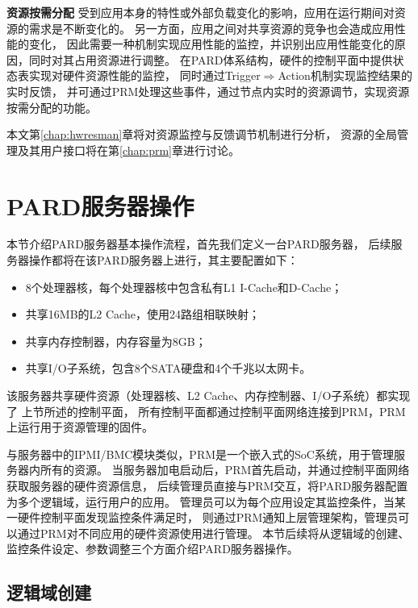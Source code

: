 \textbf{资源按需分配}\quad
受到应用本身的特性或外部负载变化的影响，应用在运行期间对资源的需求是不断变化的。
另一方面，应用之间对共享资源的竞争也会造成应用性能的变化，
因此需要一种机制实现应用性能的监控，并识别出应用性能变化的原因，同时对其占用资源进行调整。
在PARD体系结构，硬件的控制平面中提供状态表实现对硬件资源性能的监控，
同时通过Trigger$\Rightarrow$Action机制实现监控结果的实时反馈，
并可通过PRM处理这些事件，通过节点内实时的资源调节，实现资源按需分配的功能。

本文第\ref{chap:hwresman}章将对资源监控与反馈调节机制进行分析，
资源的全局管理及其用户接口将在第\ref{chap:prm}章进行讨论。


\section{PARD服务器操作}

本节介绍PARD服务器基本操作流程，首先我们定义一台PARD服务器，
后续服务器操作都将在该PARD服务器上进行，其主要配置如下：

\begin{itemize}
  \item 8个处理器核，每个处理器核中包含私有L1 I-Cache和D-Cache；
  \item 共享16MB的L2 Cache，使用24路组相联映射；
  \item 共享内存控制器，内存容量为8GB；
  \item 共享I/O子系统，包含8个SATA硬盘和4个千兆以太网卡。
\end{itemize}

该服务器共享硬件资源（处理器核、L2 Cache、内存控制器、I/O子系统）都实现了
上节所述的控制平面，%
所有控制平面都通过控制平面网络连接到PRM，PRM上运行用于资源管理的固件。

与服务器中的IPMI/BMC模块\cite{ipmi}类似，PRM是一个嵌入式的SoC系统，用于管理服务器内所有的资源。
当服务器加电启动后，PRM首先启动，并通过控制平面网络获取服务器的硬件资源信息，
后续管理员直接与PRM交互，将PARD服务器配置为多个逻辑域，运行用户的应用。
管理员可以为每个应用设定其监控条件，当某一硬件控制平面发现监控条件满足时，
则通过PRM通知上层管理架构，管理员可以通过PRM对不同应用的硬件资源使用进行管理。
本节后续将从逻辑域的创建、监控条件设定、参数调整三个方面介绍PARD服务器操作。

\subsection{逻辑域创建}

